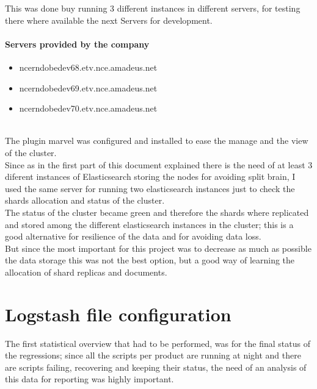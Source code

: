 This was done buy running 3 different instances in different servers, for testing there where available the next Servers for development.

\paragraph{Servers provided by the company}
\begin{itemize}
\item ncerndobedev68.etv.nce.amadeus.net
\item ncerndobedev69.etv.nce.amadeus.net
\item ncerndobedev70.etv.nce.amadeus.net
\end{itemize}

\\

The plugin marvel was configured and installed to ease the manage and the view of the cluster.
\\
 
Since as in the first part of this document explained there is the need of at least 3 diferent instances of Elasticsearch storing the nodes for avoiding split brain, I used the same server for running two elasticsearch instances just to check the shards allocation and status of the cluster. 
\\

The status of the cluster became green and therefore the shards where replicated and stored among the different elasticsearch instances in the cluster; this is a good alternative for resilience of the data and for avoiding data loss. 
\\

But since the most important for this project was to decrease as much as possible the data storage this was not the best option, but a good way of learning the allocation of shard replicas and documents.
\\
 
\section{Logstash file configuration}

The first statistical overview that had to be performed, was for the final status of the regressions; since all the scripts per product are running at night and there are scripts failing, recovering and keeping their status, the need of an analysis of this data for reporting was highly important.\\

